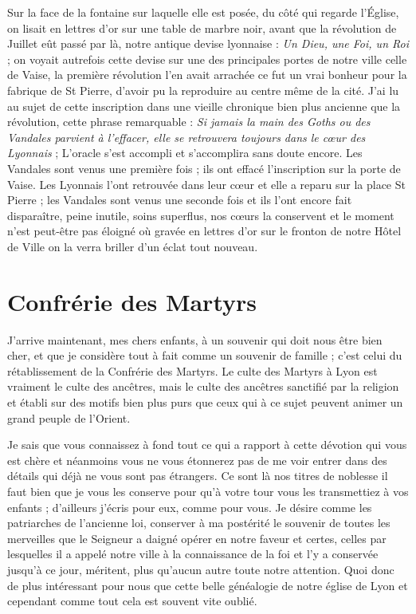 \documentclass[11pt,a4paper]{report}
\begin{document}
Sur la face de la fontaine sur laquelle elle est posée, du côté qui regarde l'Église, on lisait en lettres d'or sur une table de marbre noir, avant que la révolution de Juillet eût passé par là, notre antique devise lyonnaise : \textit{Un Dieu, une Foi, un Roi} ; on voyait autrefois cette devise sur une des principales portes de notre ville celle de Vaise, la première révolution l'en avait arrachée ce fut un vrai bonheur pour la fabrique de St Pierre, d'avoir pu la reproduire au centre même de la cité. J'ai lu au sujet de cette inscription dans une vieille chronique bien plus ancienne que la révolution, cette phrase remarquable : \textit{Si jamais la main des Goths ou des Vandales parvient à l'effacer, elle se retrouvera toujours dans le cœur des Lyonnais} ; L'oracle s'est accompli et s'accomplira sans doute encore. Les Vandales sont venus une première fois ; ils ont effacé l'inscription sur la porte de Vaise. Les Lyonnais l'ont retrouvée dans leur cœur et elle a reparu sur la place St Pierre ; les Vandales sont venus une seconde fois et ils l'ont encore fait disparaître, peine inutile, soins superflus, nos cœurs la conservent et le moment n'est peut-être pas éloigné où gravée en lettres d'or sur le fronton de notre Hôtel de Ville on la verra briller d'un éclat tout nouveau.

\section*{Confrérie des Martyrs}

J'arrive maintenant, mes chers enfants, à un souvenir qui doit nous être bien cher, et que je considère tout à fait comme un souvenir de famille ; c'est celui du rétablissement de la Confrérie des Martyrs. Le culte des Martyrs à Lyon est vraiment le culte des ancêtres, mais le culte des ancêtres sanctifié par la religion et établi sur des motifs bien plus purs que ceux qui à ce sujet peuvent animer un grand peuple de l'Orient.

Je sais que vous connaissez à fond tout ce qui a rapport à cette dévotion qui vous est chère et néanmoins vous ne vous étonnerez pas de me voir entrer dans des détails qui déjà ne vous sont pas étrangers. Ce sont là nos titres de noblesse il faut bien que je vous les conserve pour qu'à votre tour vous les transmettiez à vos enfants ; d'ailleurs j'écris pour eux, comme pour vous. Je désire comme les patriarches de l'ancienne loi, conserver à ma postérité le souvenir de toutes les merveilles que le Seigneur a daigné opérer en notre faveur et certes, celles par lesquelles il a appelé notre ville à la connaissance de la foi et l'y a conservée jusqu'à ce jour, méritent, plus qu'aucun autre toute notre attention. Quoi donc de plus intéressant pour nous que cette belle généalogie de notre église de Lyon et cependant comme tout cela est souvent vite oublié.
\end{document}
